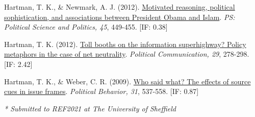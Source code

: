 \documentclass[12pt]{article}
\newcommand{\blankline}{\quad\pagebreak[3]}
\newcommand{\halfblankline}{\quad\vspace{-0.5\baselineskip}\pagebreak[3]}
\begin{document}
\begin{bibenum}
    \item {Hartman, T. K.}, \& Newmark, A. J. (2012). 
          \href{https://10.1017/S1049096512000327}
          {Motivated reasoning, political sophistication, 
          and associations between President Obama and Islam}. 
          \emph{PS: Political Science and Politics, 45}, 449-455. [IF: 0.38]

    \item {Hartman, T. K.} (2012). 
          \href{https://10.1080/10584609.2012.694983}
          {Toll booths on the information superhighway? 
          Policy metaphors in the case of net neutrality}. 
          \emph{Political Communication, 29}, 278-298. [IF: 2.42]

    \item {Hartman, T. K.}, \& Weber, C. R. (2009). 
          \href{https://10.1007/s11109-009-9088-y}
          {Who said what? The effects of source cues in issue frames}. 
          \emph{Political Behavior, 31}, 537-558. [IF: 0.87]
          
\end{bibenum}

\blankline

\textit{* Submitted to REF2021 at The University of Sheffield}

\halfblankline
\end{document}
